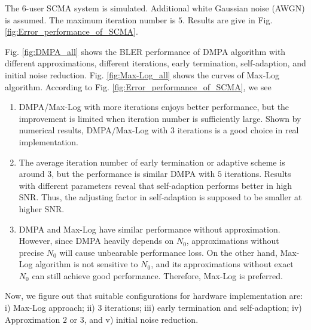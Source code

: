 \documentclass[journal,twoside]{IEEEtran}
\begin{document}
The $6$-user SCMA system is simulated. Additional white Gaussian noise (AWGN) is assumed. The maximum iteration number is $5$. Results are give in Fig. \ref{fig:Error_performance_of_SCMA}.

Fig. \ref{fig:DMPA_all} shows the BLER performance of DMPA algorithm with different approximations, different iterations, early termination, self-adaption, and initial noise reduction. Fig. \ref{fig:Max-Log_all} shows the curves of Max-Log algorithm. According to Fig. \ref{fig:Error_performance_of_SCMA}, we see

\begin{enumerate}
  \item DMPA/Max-Log with more iterations enjoys better performance, but the improvement is limited when iteration number is sufficiently large. Shown by numerical results, DMPA/Max-Log with $3$ iterations is a good choice in real implementation.
  \item The average iteration number of early termination or adaptive scheme is around $3$, but the performance is similar DMPA with $5$ iterations. Results with different parameters reveal that self-adaption performs better in high SNR. Thus, the adjusting factor in self-adaption is supposed to be smaller at higher SNR.
  \item DMPA and Max-Log have similar performance without approximation. However, since DMPA heavily depends on $N_0$, approximations without precise $N_0$ will cause unbearable performance loss. On the other hand, Max-Log algorithm is not sensitive to $N_0$, and its approximations without exact $N_0$ can still achieve good performance. Therefore, Max-Log is preferred.
\end{enumerate}

Now, we figure out that suitable configurations for hardware implementation are: i) Max-Log approach; ii) $3$ iterations; iii) early termination and self-adaption; iv) Approximation $2$ or $3$, and v) initial noise reduction.
\end{document}
